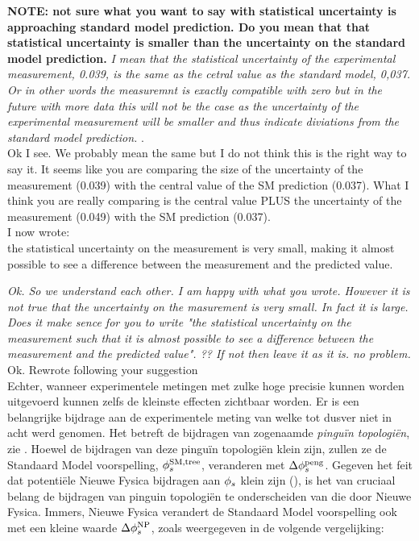 \textbf{NOTE: not sure what you want to say with statistical uncertainty is approaching standard model prediction.
 Do you mean that that statistical uncertainty is smaller than the uncertainty on the standard model prediction.}
{\color{green}\it I mean that the statistical uncertainty of the experimental measurement, 0.039, is the
same as the cetral value as the standard model, 0,037. Or in other words the measuremnt is exactly compatible
with zero but in the future with more data this will not be the case as the uncertainty of the experimental
measurement will be smaller and thus indicate diviations from the standard model prediction. }.\\
{\color{red} Ok I see. We probably mean the same but I do not think this is the right way to say it.
It seems like you are comparing the size of the uncertainty of the measurement (0.039) with the central
value of the SM prediction (0.037). What I think you are really comparing is the central value PLUS the
uncertainty of the measurement (0.049) with the SM prediction (0.037). \\
I now wrote:\\
the statistical uncertainty on the measurement is very small, making it almost possible to see a difference
between the measurement and the predicted value.}

{\color{green}\it Ok. So we understand each other. I am happy with what you wrote. However it is not true that
the uncertainty on the masurement is very small. In fact it is large. Does it make sence for you to write
 "the statistical uncertainty on the measurement such that it is almost possible to see a difference
between the measurement and the predicted value". ?? If not then leave it as it is. no problem.}\\
{\color{red} Ok. Rewrote following your suggestion}\\


Echter, wanneer experimentele metingen met zulke hoge precisie kunnen worden uitgevoerd
kunnen zelfs de kleinste effecten zichtbaar worden. Er is een belangrijke bijdrage aan de
experimentele meting van \phis welke tot dusver niet in acht werd genomen. Het betreft de
bijdragen van zogenaamde {\it pingu\"in topologi\"en}, zie  .
Hoewel de bijdragen van deze pingu\"in topologi\"en klein zijn, zullen ze de Standaard Model
voorspelling, $\phi_{s}^{\tiny \text{SM,tree}}$, veranderen met $\Delta\phi_{s}^{\tiny\text{peng}}$. Gegeven het
feit dat potenti\"ele Nieuwe Fysica bijdragen aan $\phi_{s}$ klein zijn (),
is het van cruciaal belang de bijdragen van pinguin topologi\"en te onderscheiden van die door Nieuwe Fysica.
Immers, Nieuwe Fysica verandert de Standaard Model voorspelling ook met een kleine waarde
 $\Delta\phi_{s}^{\tiny \text{NP}}$, zoals weergegeven in de volgende vergelijking:


